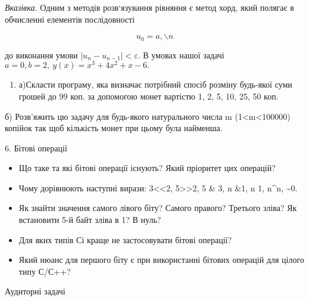 \documentclass[]{article}
\begin{document}
\emph{\emph{Вказівка.}} Одним з методів розв`язування рівняння є метод
хорд, який полягає в обчисленні елементів послідовності

\[u_{0} = a,\backslash n\]

до виконання умови \(\left| u_{n} - u_{n - 1} \right| < \varepsilon\). В
умовах нашої задачі \(a = 0,b = 2,\ y(x) = x^{3} + 4x^{2} + x - 6.\)

\begin{enumerate}
\def\labelenumi{\arabic{enumi})}
\item
  а)Скласти програму, яка визначає потрібний спосіб розміну будь-якої
  суми грошей до 99 коп. за допомогою монет вартістю 1, 2, 5, 10, 25, 50
  коп.
\end{enumerate}

б) Розв'яжить цю задачу для будь-якого натурального числа m
(1\textless{}m\textless{}100000) копійок так щоб кількість монет при
цьому була найменша.

6. Бітові операції

\begin{itemize}
\item
  Що таке та які бітові операції існують? Який пріоритет цих операцій?
\item
  \protect\hypertarget{_Hlk65235798}{}{}Чому дорівнюють наступні вирази:
  3\textless{}\textless{}2, 5\textgreater{}\textgreater{}2, 5 \& 3, n
  \&1, n \textbar{} 1, n\^{}n, \textasciitilde{}0.
\item
  Як знайти значення самого лівого біту? Самого правого? Третього зліва?
  Як встановити 5-й байт зліва в 1? В нуль?
\item
  Для яких типів Сі краще не застосовувати бітові операції?
\item
  Який нюанс для першого біту є при використанні бітових операцій для
  цілого типу С/С++?
\end{itemize}

Аудиторні задачі
\end{document}
